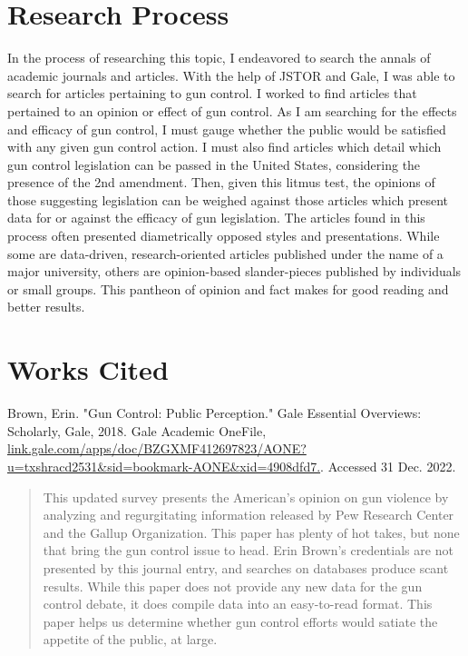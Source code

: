 \documentclass [12pt]{article}
\newcommand{\bibent}{\noindent \hangindent 40pt}
\newcommand{\bibannote}{\begin{quotation}}
\newcommand{\bibendote}{\end{quotation}}
\begin{document}
\section{Research Process}
In the process of researching this topic, I endeavored to search the annals of academic journals and articles. With the help of JSTOR and Gale, I was able to search for articles pertaining to gun control. I worked to find articles that pertained to an opinion or effect of gun control. As I am searching for the effects and efficacy of gun control, I must gauge whether the public would be satisfied with any given gun control action. I must also find articles which detail which gun control legislation can be passed in the United States, considering the presence of the 2nd amendment. Then, given this litmus test, the opinions of those suggesting legislation can be weighed against those articles which present data for or against the efficacy of gun legislation. The articles found in this process often presented diametrically opposed styles and presentations. While some are data-driven, research-oriented articles published under the name of a major university, others are opinion-based slander-pieces published by individuals or small groups. This pantheon of opinion and fact makes for good reading and better results. 
\pagebreak
\section{Works Cited}
\bibent Brown, Erin. "Gun Control: Public Perception." Gale Essential Overviews: Scholarly, Gale, 2018. Gale Academic OneFile, \url{link.gale.com/apps/doc/BZGXMF412697823/AONE?u=txshracd2531&sid=bookmark-AONE&xid=4908dfd7.}. Accessed 31 Dec. 2022.
\bibannote
This updated survey presents the American's opinion on gun violence by analyzing and regurgitating information released by Pew Research Center and the Gallup Organization. This paper has plenty of hot takes, but none that bring the gun control issue to head. Erin Brown's credentials are not presented by this journal entry, and searches on databases produce scant results. While this paper does not provide any new data for the gun control debate, it does compile data into an easy-to-read format. This paper helps us determine whether gun control efforts would satiate the appetite of the public, at large. 
\bibendote
\end{document}
